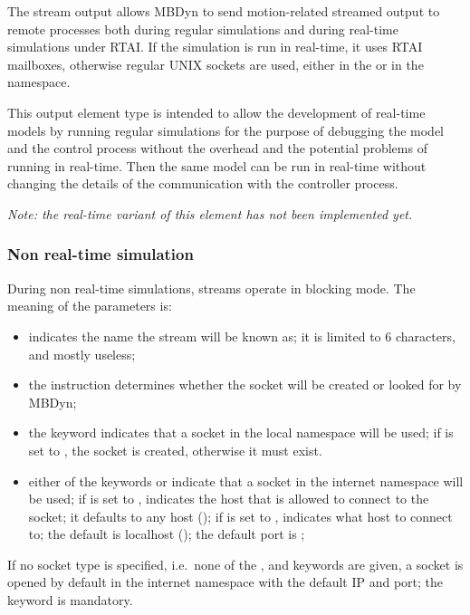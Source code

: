 The stream output allows MBDyn to send motion-related streamed output 
to remote processes both during regular simulations and during 
real-time simulations under RTAI.
If the simulation is run in real-time, it uses RTAI mailboxes, 
otherwise regular UNIX sockets are used, either in the  or 
in the  namespace.

This output element type is intended to allow the development 
of real-time models by running regular simulations for the purpose 
of debugging the model and the control process without the overhead 
and the potential problems of running in real-time.
Then the same model can be run in real-time without changing the details
of the communication with the controller process.

\noindent
\emph{Note: the real-time variant of this element has not been implemented
yet.}

\subsubsection{Non real-time simulation}
During non real-time simulations, streams operate in blocking mode.
The meaning of the parameters is:
\begin{itemize}
\item {} indicates the name the stream
will be known as; it is limited to 6 characters, and mostly useless;
\item the instruction  determines whether the socket will be
created or looked for by MBDyn;
\item the keyword  indicates that a socket 
in the local namespace will be used; if  is set to ,
the socket is created, otherwise it must exist.
\item either of the keywords  or  indicate that a socket
in the internet namespace will be used;
if  is set to ,  indicates 
the host that is allowed to connect to the socket; it defaults 
to any host (); if  is set to ,
 indicates what host to connect to; the default 
is localhost (); the default port is ;
\end{itemize}
If no socket type is specified, i.e.\ none of the ,  
and  keywords are given, a socket is opened by default 
in the internet namespace with the default IP and port; the 
keyword is mandatory.

